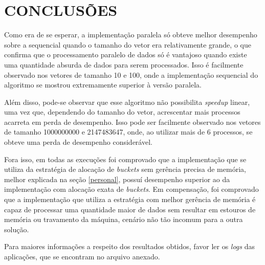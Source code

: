 \section{\normalsize CONCLUSÕES}
	Como era de se esperar, a implementação paralela só obteve melhor desempenho sobre a sequencial quando o tamanho do vetor era relativamente grande, o que confirma que o processamento paralelo de dados só é vantajoso quando existe uma quantidade absurda de dados para serem processados. Isso é facilmente observado nos vetores de tamanho 10 e 100, onde a implementação sequencial do algoritmo se mostrou extremamente superior à versão paralela.
	
	Além disso, pode-se observar que esse algoritmo não possibilita \textit{speedup} linear, uma vez que, dependendo do tamanho do vetor, acrescentar mais processos acarreta em perda de desempenho. Isso pode ser facilmente observado nos vetores de tamanho 1000000000 e 2147483647, onde, ao utilizar mais de 6 processos, se obteve uma perda de desempenho considerável.
	
	Fora isso, em todas as execuções foi comprovado que a implementação que se utiliza da estratégia de alocação de \textit{buckets} sem gerência precisa de memória, melhor explicada na seção \ref{personal}, possuí desempenho superior ao da implementação com alocação exata de \textit{buckets}. Em compensação, foi comprovado que a implementação que utiliza a estratégia com melhor gerência de memória é capaz de processar uma quantidade maior de dados sem resultar em estouros de memória ou travamento da máquina, cenário não tão incomum para a outra solução.
	
	Para maiores informações a respeito dos resultados obtidos, favor ler os \textit{logs} das aplicações, que se encontram no arquivo anexado.